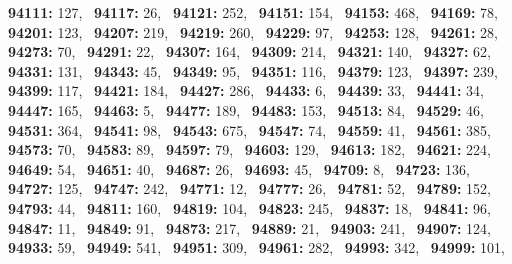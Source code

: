 \textbf{94111:} 127,\allowbreak~ 
\textbf{94117:} 26,\allowbreak~ 
\textbf{94121:} 252,\allowbreak~ 
\textbf{94151:} 154,\allowbreak~ 
\textbf{94153:} 468,\allowbreak~ 
\textbf{94169:} 78,\allowbreak~ 
\textbf{94201:} 123,\allowbreak~ 
\textbf{94207:} 219,\allowbreak~ 
\textbf{94219:} 260,\allowbreak~ 
\textbf{94229:} 97,\allowbreak~ 
\textbf{94253:} 128,\allowbreak~ 
\textbf{94261:} 28,\allowbreak~ 
\textbf{94273:} 70,\allowbreak~ 
\textbf{94291:} 22,\allowbreak~ 
\textbf{94307:} 164,\allowbreak~ 
\textbf{94309:} 214,\allowbreak~ 
\textbf{94321:} 140,\allowbreak~ 
\textbf{94327:} 62,\allowbreak~ 
\textbf{94331:} 131,\allowbreak~ 
\textbf{94343:} 45,\allowbreak~ 
\textbf{94349:} 95,\allowbreak~ 
\textbf{94351:} 116,\allowbreak~ 
\textbf{94379:} 123,\allowbreak~ 
\textbf{94397:} 239,\allowbreak~ 
\textbf{94399:} 117,\allowbreak~ 
\textbf{94421:} 184,\allowbreak~ 
\textbf{94427:} 286,\allowbreak~ 
\textbf{94433:} 6,\allowbreak~ 
\textbf{94439:} 33,\allowbreak~ 
\textbf{94441:} 34,\allowbreak~ 
\textbf{94447:} 165,\allowbreak~ 
\textbf{94463:} 5,\allowbreak~ 
\textbf{94477:} 189,\allowbreak~ 
\textbf{94483:} 153,\allowbreak~ 
\textbf{94513:} 84,\allowbreak~ 
\textbf{94529:} 46,\allowbreak~ 
\textbf{94531:} 364,\allowbreak~ 
\textbf{94541:} 98,\allowbreak~ 
\textbf{94543:} 675,\allowbreak~ 
\textbf{94547:} 74,\allowbreak~ 
\textbf{94559:} 41,\allowbreak~ 
\textbf{94561:} 385,\allowbreak~ 
\textbf{94573:} 70,\allowbreak~ 
\textbf{94583:} 89,\allowbreak~ 
\textbf{94597:} 79,\allowbreak~ 
\textbf{94603:} 129,\allowbreak~ 
\textbf{94613:} 182,\allowbreak~ 
\textbf{94621:} 224,\allowbreak~ 
\textbf{94649:} 54,\allowbreak~ 
\textbf{94651:} 40,\allowbreak~ 
\textbf{94687:} 26,\allowbreak~ 
\textbf{94693:} 45,\allowbreak~ 
\textbf{94709:} 8,\allowbreak~ 
\textbf{94723:} 136,\allowbreak~ 
\textbf{94727:} 125,\allowbreak~ 
\textbf{94747:} 242,\allowbreak~ 
\textbf{94771:} 12,\allowbreak~ 
\textbf{94777:} 26,\allowbreak~ 
\textbf{94781:} 52,\allowbreak~ 
\textbf{94789:} 152,\allowbreak~ 
\textbf{94793:} 44,\allowbreak~ 
\textbf{94811:} 160,\allowbreak~ 
\textbf{94819:} 104,\allowbreak~ 
\textbf{94823:} 245,\allowbreak~ 
\textbf{94837:} 18,\allowbreak~ 
\textbf{94841:} 96,\allowbreak~ 
\textbf{94847:} 11,\allowbreak~ 
\textbf{94849:} 91,\allowbreak~ 
\textbf{94873:} 217,\allowbreak~ 
\textbf{94889:} 21,\allowbreak~ 
\textbf{94903:} 241,\allowbreak~ 
\textbf{94907:} 124,\allowbreak~ 
\textbf{94933:} 59,\allowbreak~ 
\textbf{94949:} 541,\allowbreak~ 
\textbf{94951:} 309,\allowbreak~ 
\textbf{94961:} 282,\allowbreak~ 
\textbf{94993:} 342,\allowbreak~ 
\textbf{94999:} 101,\allowbreak~ 

